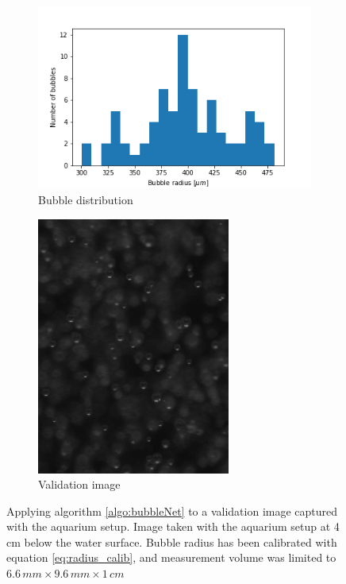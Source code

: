 				\begin{figure}
					\begin{subfigure}[t]{.4\textwidth}
						\includegraphics[scale=0.6]{graphs/b_val_0.png}
						\caption{Bubble distribution}
						\label{subfig:b_val_0}
					\end{subfigure}\hfill
					\begin{subfigure}[t]{.4\textwidth}
						\includegraphics[scale=0.6]{images/val_1.png}
						\caption{Validation image}
						\label{subfig:val_0}
					\end{subfigure}
					\caption{Applying algorithm \ref{algo:bubbleNet} to a validation image captured with the aquarium setup. Image taken with the aquarium setup at 4\,cm below the water surface. Bubble radius has been calibrated with equation \ref{eq:radius_calib}, and measurement volume was limited to $6.6\, mm \times 9.6 \, mm \times 1\, cm$}
					\label{bubb_dist_1}
				\end{figure}




